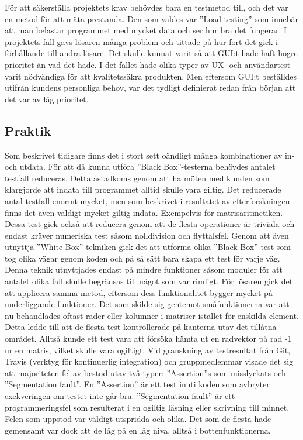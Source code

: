För att säkerställa projektets krav behövdes bara en testmetod till, och det var en metod för att mäta prestanda. Den som valdes var ''Load testing'' som innebär att man belastar programmet med mycket data och ser hur bra det fungerar. I projektets fall gavs lösaren många problem och tittade på hur fort det gick i förhållande till andra lösare. \newline	
Det skulle kunnat varit så att GUI:t hade haft högre prioritet än vad det hade. I det fallet hade olika typer av UX- och användartest varit nödvändiga för att kvalitetssäkra produkten. Men eftersom GUI:t beställdes utifrån kundens personliga behov, var det tydligt definierat redan från början att det var av låg prioritet. 
	
	\subsection{Praktik}
	Som beskrivet tidigare finns det i stort sett oändligt många kombinationer av in- och utdata.	För att då kunna utföra ''Black Box''-testerna behövdes antalet testfall reduceras. Detta åstadkoms genom att ha möten med kunden som klargjorde att indata till programmet alltid skulle vara giltig. Det reducerade antal testfall enormt mycket, men som beskrivet i resultatet av efterforskningen finns det även väldigt mycket giltig indata. Exempelvis för matrisaritmetiken. Dessa test gick också att reducera genom att de flesta operationer är triviala och endast kräver numeriska test såsom nolldivision och flyttalsfel. Genom att även utnyttja ''White Box''-tekniken gick det att utforma olika ''Black Box''-test som tog olika vägar genom koden och på så sätt bara skapa ett test för varje väg. Denna teknik utnyttjades endast på mindre funktioner såsom moduler för att antalet olika fall skulle begränsas till något som var rimligt. \newline
	För lösaren gick det att applicera samma metod, eftersom dess funktionalitet bygger mycket på underliggande funktioner. Det som skilde sig gentemot småfunktionerna var att nu behandlades oftast rader eller kolumner i matriser istället för enskilda element. Detta ledde till att de flesta test kontrollerade på kanterna utav det tillåtna området. Alltså kunde ett test vara att försöka hämta ut en radvektor på rad -1 ur en matris, vilket skulle vara ogiltigt.\newline
Vid granskning av testresultat från Git, Travis (verktyg för kontinuerlig integration) och gruppmedlemmar visade det sig att majoriteten fel av bestod utav två typer: ''Assertion''s som misslyckats och ''Segmentation fault''. En ''Assertion'' är ett test inuti koden som avbryter exekveringen om testet inte går bra. ''Segmentation fault'' är ett programmeringsfel som resulterat i en ogiltig läsning eller skrivning till minnet. Felen som uppstod var väldigt utspridda och olika. Det som de flesta hade gemensamt var dock att de låg på en låg nivå, alltså i bottenfunktionerna. \newline	
